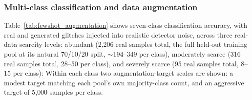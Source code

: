 \documentclass[reprint,nofootinbib,amsmath,amssymb,aps,floatfix]{revtex4-2}
\begin{document}

\subsubsection{Multi-class classification and data augmentation}
\label{sec:multiclass_results}

Table~\ref{tab:fewshot_augmentation} shows seven-class classification accuracy, with real and generated glitches injected into realistic detector noise, across three real-data scarcity levels: abundant (2{,}206 real samples total, the full held-out training pool at its natural 70/10/20 split, $\sim$194--349 per class), moderately scarce (316 real samples total, 28--50 per class), and severely scarce (95 real samples total, 8--15 per class): Within each class two augmentation-target scales are shown: a modest target matching each pool's own majority-class count, and an aggressive target of 5{,}000 samples per class.
\end{document}
